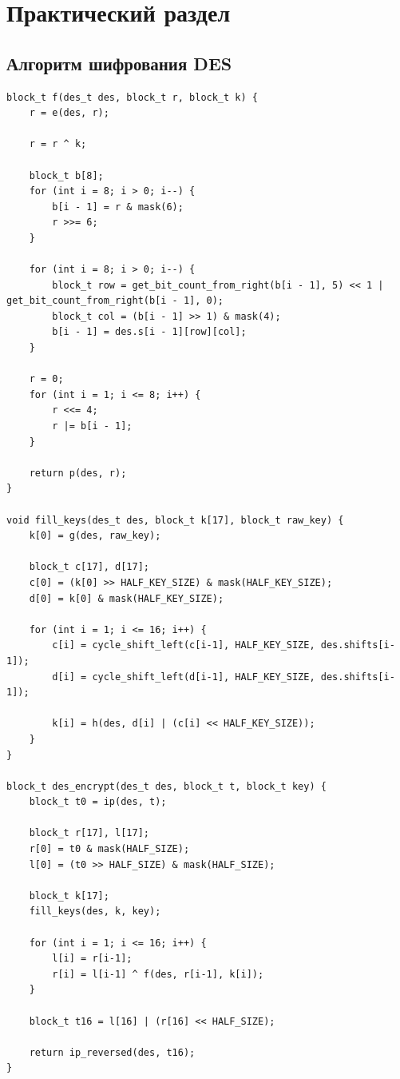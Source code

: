 \chapter{Практический раздел}

\section{Алгоритм шифрования DES}

\begin{lstlisting}[label=des,caption=Реализация алгоритма шифрования DES]
block_t f(des_t des, block_t r, block_t k) {
    r = e(des, r);

    r = r ^ k;

    block_t b[8];
    for (int i = 8; i > 0; i--) {
        b[i - 1] = r & mask(6);
        r >>= 6;
    }

    for (int i = 8; i > 0; i--) {
        block_t row = get_bit_count_from_right(b[i - 1], 5) << 1 | get_bit_count_from_right(b[i - 1], 0);
        block_t col = (b[i - 1] >> 1) & mask(4);
        b[i - 1] = des.s[i - 1][row][col];
    }

    r = 0;
    for (int i = 1; i <= 8; i++) {
        r <<= 4;
        r |= b[i - 1];
    }

    return p(des, r);
}

void fill_keys(des_t des, block_t k[17], block_t raw_key) {
    k[0] = g(des, raw_key);

    block_t c[17], d[17];
    c[0] = (k[0] >> HALF_KEY_SIZE) & mask(HALF_KEY_SIZE);
    d[0] = k[0] & mask(HALF_KEY_SIZE);

    for (int i = 1; i <= 16; i++) {
        c[i] = cycle_shift_left(c[i-1], HALF_KEY_SIZE, des.shifts[i-1]);
        d[i] = cycle_shift_left(d[i-1], HALF_KEY_SIZE, des.shifts[i-1]);

        k[i] = h(des, d[i] | (c[i] << HALF_KEY_SIZE));
    }
}

block_t des_encrypt(des_t des, block_t t, block_t key) {
    block_t t0 = ip(des, t);

    block_t r[17], l[17];
    r[0] = t0 & mask(HALF_SIZE);
    l[0] = (t0 >> HALF_SIZE) & mask(HALF_SIZE);

    block_t k[17];
    fill_keys(des, k, key);

    for (int i = 1; i <= 16; i++) {
        l[i] = r[i-1];
        r[i] = l[i-1] ^ f(des, r[i-1], k[i]);
    }

    block_t t16 = l[16] | (r[16] << HALF_SIZE);

    return ip_reversed(des, t16);
}


\end{lstlisting}
